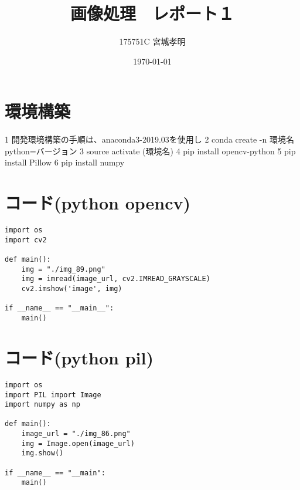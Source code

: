 \documentclass[a4paper,11pt,titlepage]{bxjsarticle}
\title{画像処理　レポート１}
\author{175751C 宮城孝明}
\date{\today}
\begin{document}
\maketitle
\tableofcontents
\clearpage
\section{環境構築}
  1 開発環境構築の手順は、anaconda3-2019.03を使用し
  2 conda create -n 環境名 python=バージョン
  3 source activate (環境名)
  4 pip install opencv-python
  5 pip install Pillow
  6 pip install numpy
\section{コード(python opencv)}
\begin{lstlisting}[basicstyle=\ttfamily\footnotesize, frame=single]
import os
import cv2

def main():
    img = "./img_89.png"
    img = imread(image_url, cv2.IMREAD_GRAYSCALE)
    cv2.imshow('image', img)

if __name__ == "__main__":
    main()
\end{lstlisting}
\section{コード(python pil)}
\begin{lstlisting}[basicstyle=\ttfamily\footnotesize, frame=single]
import os
import PIL import Image
import numpy as np

def main():
    image_url = "./img_86.png"
    img = Image.open(image_url)
    img.show()

if __name__ == "__main":
    main()
\end{lstlisting}



\begin{thebibliography}{99}
\end{thebibliography}
\end{document}
